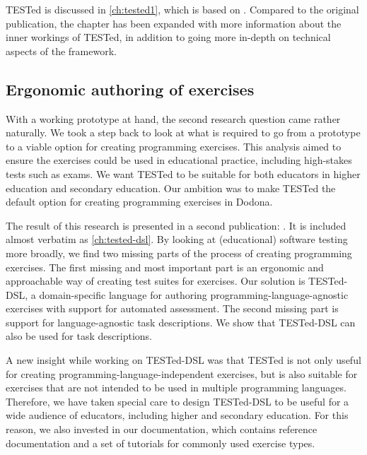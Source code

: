 \documentclass[../main]{subfiles}
\begin{document}
TESTed is discussed in \cref{ch:tested1}, which is based on \textcite{strijbolTESTedEducationalTesting2023}.
Compared to the original publication, the chapter has been expanded with more information about the inner workings of TESTed, in addition to going more in-depth on technical aspects of the framework.

\subsection{Ergonomic authoring of exercises}\label{subsec:ergonomic-testing}

With a working prototype at hand, the second research question  came rather naturally.
We took a step back to look at what is required to go from a prototype to a viable option for creating programming exercises.
This analysis aimed to ensure the exercises could be used in educational practice, including high-stakes tests such as exams.
We want TESTed to be suitable for both educators in higher education and secondary education.
Our ambition was to make TESTed the default option for creating programming exercises in Dodona.

The result of this research is presented in a second publication: \textcite{strijbolTESTedDSLDomainspecificLanguage2024}.
It is included almost verbatim as \cref{ch:tested-dsl}.
By looking at (educational) software testing more broadly, we find two missing parts of the process of creating programming exercises.
The first missing and most important part is an ergonomic and approachable way of creating test suites for exercises.
Our solution is TESTed-DSL, a domain-specific language for authoring programming-language-agnostic exercises with support for automated assessment.
The second missing part is support for language-agnostic task descriptions.
We show that TESTed-DSL can also be used for task descriptions.

A new insight while working on TESTed-DSL was that TESTed is not only useful for creating programming-language-independent exercises, but is also suitable for exercises that are not intended to be used in multiple programming languages.
Therefore, we have taken special care to design TESTed-DSL to be useful for a wide audience of educators, including higher and secondary education.
For this reason, we also invested in our documentation, which contains reference documentation and a set of tutorials for commonly used exercise types.
\end{document}
